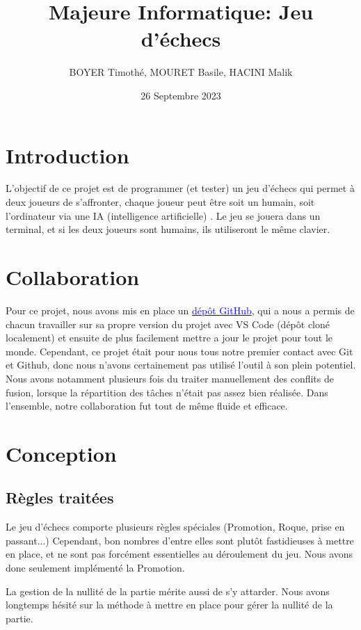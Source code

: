\documentclass{article}
\title{\centering Majeure Informatique: 
Jeu d'échecs}
\author{BOYER Timothé, MOURET Basile, HACINI Malik}
\date{26 Septembre 2023}
\begin{document}
    
    

\maketitle
\tableofcontents{}

\section{Introduction}
L’objectif de ce projet est de programmer (et tester) un jeu
d’échecs qui permet à deux joueurs de s’affronter, 
chaque joueur peut être soit un humain, soit l’ordinateur via une IA
 (intelligence artificielle) . Le jeu se jouera dans un terminal, 
 et si les deux joueurs sont humains, ils utiliseront le même clavier.
 \section{Collaboration}
 
Pour ce projet, nous avons mis en place un \href{https://github.com/Zertag/Projet-POO}{\textcolor{blue}{dépôt GitHub}}, qui a nous a permis
de chacun travailler sur sa propre version du projet avec VS Code (dépôt cloné localement) et 
ensuite de plus facilement mettre a jour le projet pour tout le monde.
Cependant, ce projet était pour nous tous notre premier contact avec Git et Github, donc
nous n'avons certainement pas utilisé l'outil à son plein potentiel. Nous avons notamment
plusieurs fois du traiter manuellement des conflits de fusion, lorsque la répartition
des tâches n'était pas assez bien réalisée.
Dans l'ensemble, notre collaboration fut tout de même fluide et efficace.
\section{Conception}
\subsection{Règles traitées}
Le jeu d'échecs comporte plusieurs règles spéciales (Promotion, Roque, prise en passant...)
Cependant, bon nombres d'entre elles sont plutôt fastidieuses à mettre en place,
et ne sont pas forcément essentielles au déroulement du jeu.
Nous avons donc seulement implémenté la Promotion.

La gestion de la nullité de la partie mérite aussi de s'y attarder.
Nous avons longtemps hésité sur la méthode à mettre en place pour gérer la nullité de la partie.
\end{document}
